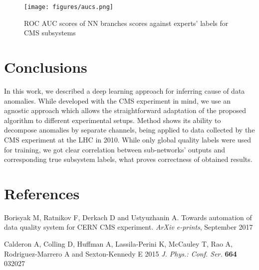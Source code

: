 \documentclass[a4paper]{jpconf}
\begin{document}
\begin{figure}[H]
\begin{center}
\texttt{[image: figures/aucs.png]}
\end{center}
\caption{\label{label}ROC AUC scores of NN branches scores against experts' labels for CMS subsystems}
\end{figure}



\section{Conclusions}
In this work, we described a deep learning approach for inferring cause of data anomalies. While developed
with the CMS experiment in mind, we use an agnostic approach which allows the straightforward
adaptation of the proposed algorithm to different experimental setups. Method shows its ability to decompose anomalies by separate channels, being applied to data collected by the CMS experiment at the LHC in 2010. While only global quality labels were used for training, we got clear correlation between sub-networks’ outputs and corresponding true subsystem labels, what proves correctness of obtained results.

\section*{References}
\begin{thebibliography}{2}
\item Borisyak M, Ratnikov F, Derkach D and Ustyuzhanin A. Towards automation of data quality system for CERN CMS experiment. {\it ArXiv e-prints}, September 2017

\item  Calderon A, Colling D, Huffman A, Lassila-Perini K, McCauley T, Rao A, Rodriguez-Marrero A and Sexton-Kennedy E 2015 {\it J. Phys.: Conf. Ser.} {\bf 664} 032027
\end{thebibliography}
\end{document}
